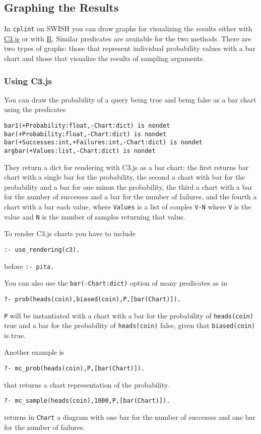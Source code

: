 \subsection{Graphing the Results}
\label{graphing}

In \texttt{cplint} on SWISH you can draw graphs
for visualizing the results either with \href{http://www.c3js.org/}{C3.js} or with \href{https://www.r-project.org/}{R}. Similar predicates are avaiiable for the two methods.
 There are two types
of graphs: those that represent individual probability values with a bar chart and those that
visualize the results of sampling arguments.

\subsubsection{Using C3.js}
You can draw the probability of a query being true and
being false as a bar chart using the predicates
\begin{verbatim}
bar1(+Probability:float,-Chart:dict) is nondet
bar(+Probability:float,-Chart:dict) is nondet
bar(+Successes:int,+Failures:int,-Chart:dict) is nondet
argbar(+Values:list,-Chart:dict) is nondet
\end{verbatim}
They return  a dict for rendering with C3.js as a bar chart:
the first  returns bar chart with
a single bar for the probability,  the second a chart with
bar for the probability and a bar for one minus the probability,
the third a  chart with
a bar for the number of successes and a bar for the number of failures, and
the fourth a  chart with
a bar each value, where \verb|Values| is a list of couples \verb|V-N| where
  \verb|V| is the value and \verb|N| is the number of samples
  returning that value.
 
To render C3.js charts  you have to include
\begin{verbatim}
:- use_rendering(c3).
\end{verbatim}
before \verb|:- pita.| 

You can also use the  \verb|bar(-Chart:dict)| option of many predicates
as in
\begin{verbatim}
?- prob(heads(coin),biased(coin),P,[bar(Chart)]).
\end{verbatim}
\verb|P| will be instantiated with a
 chart with
a bar for the probability of \verb|heads(coin)| true and a bar for the probability of \verb|heads(coin)| false,
given that \verb|biased(coin)| is true.

Another example is
\begin{verbatim}
?- mc_prob(heads(coin),P,[bar(Chart)]).
\end{verbatim}
that returns a chart representation of the probability.
\begin{verbatim}
?- mc_sample(heads(coin),1000,P,[bar(Chart)]).
\end{verbatim}
returns in \verb|Chart| a diagram with one bar for the number of successes and
one bar for the number of failures.

